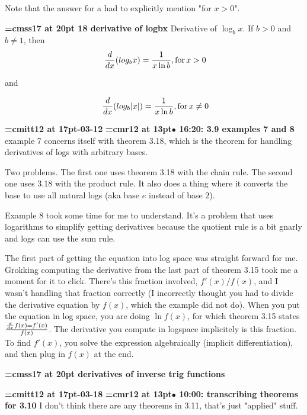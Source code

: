 Note that the answer for a had to explicitly mention "for $x > 0$".
\par

{\medskip\noindent\bf\font\titlefont=cmss17 at 20pt 18 derivative of logbx}\medskip
Derivative of $\log_{b}x$.
If $b > 0$ and $b \ne 1$, then
$$\
{d \over dx} (log_{b} x) = {1 \over {x \ln b}}, \hbox{for}
\, x > 0
$$

and

$$\
{d \over dx}(log_{b}|x|) = {1 \over {x \ln b}}, \hbox{for}
\, x \ne 0
$$

{\medskip\noindent\bf\font\titlefont=cmitt12 at 17pt-03-12}\medskip
{\smallskip\noindent\bf\font\titlefont=cmr12 at 13pt\titlefont $\bullet$ 16:20: 3.9 examples 7 and 8}\smallskip
example 7 concerns itself with theorem 3.18, which is the theorem for handling derivatives of logs with arbitrary bases.
\par

Two problems. The first one uses theorem 3.18 with the chain rule. The second one uses 3.18 with the product rule. It also does a thing where it converts the base to use all natural logs (aka base $e$ instead of base $2$).
\par

Example 8 took some time for me to understand. It's a problem that uses logarithms to simplify getting derivatives because the quotient rule is a bit gnarly and logs can use the sum rule.
\par

The first part of getting the equation into log space was straight forward for me. Grokking computing the derivative  from the last part of theorem 3.15 took me a moment for it to click. There's this fraction involved, $f'(x)/f(x)$, and I wasn't handling that fraction correctly (I incorrectly thought you had to divide the derivative equation by $f(x)$, which the example did not do). When you put the equation in log space, you are doing $\ln f(x)$, for which theorem 3.15 states ${d \over dx} f(x) = f'(x) \over f(x)$. The derivative you compute in logspace implicitely is this fraction. To find $f'(x)$, you solve the expression algebraically (implicit differentiation), and then plug in $f(x)$ at the end.
\par

{\medskip\noindent\bf\font\titlefont=cmss17 at 20pt derivatives of inverse trig functions}\medskip

{\medskip\noindent\bf\font\titlefont=cmitt12 at 17pt\titlefont 2026-03-18}\medskip
{\smallskip\noindent\bf\font\titlefont=cmr12 at 13pt\titlefont $\bullet$ 10:00: transcribing theorems for 3.10}\smallskip
I don't think there are any theorems in 3.11, that's just "applied" stuff.
\par

